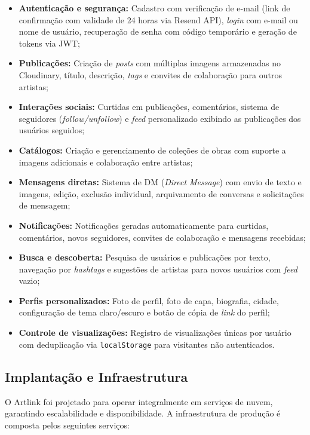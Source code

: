 \documentclass[a4paper, 12pt, oneside]{article}
\begin{document}
\begin{itemize}
    \item \textbf{Autenticação e segurança:} Cadastro com verificação de e-mail (link de confirmação com validade de 24 horas via Resend API), \textit{login} com e-mail ou nome de usuário, recuperação de senha com código temporário e geração de tokens via JWT;
    \item \textbf{Publicações:} Criação de \textit{posts} com múltiplas imagens armazenadas no Cloudinary, título, descrição, \textit{tags} e convites de colaboração para outros artistas;
    \item \textbf{Interações sociais:} Curtidas em publicações, comentários, sistema de seguidores (\textit{follow/unfollow}) e \textit{feed} personalizado exibindo as publicações dos usuários seguidos;
    \item \textbf{Catálogos:} Criação e gerenciamento de coleções de obras com suporte a imagens adicionais e colaboração entre artistas;
    \item \textbf{Mensagens diretas:} Sistema de DM (\textit{Direct Message}) com envio de texto e imagens, edição, exclusão individual, arquivamento de conversas e solicitações de mensagem;
    \item \textbf{Notificações:} Notificações geradas automaticamente para curtidas, comentários, novos seguidores, convites de colaboração e mensagens recebidas;
    \item \textbf{Busca e descoberta:} Pesquisa de usuários e publicações por texto, navegação por \textit{hashtags} e sugestões de artistas para novos usuários com \textit{feed} vazio;
    \item \textbf{Perfis personalizados:} Foto de perfil, foto de capa, biografia, cidade, configuração de tema claro/escuro e botão de cópia de \textit{link} do perfil;
    \item \textbf{Controle de visualizações:} Registro de visualizações únicas por usuário com deduplicação via \texttt{localStorage} para visitantes não autenticados.
\end{itemize}

\subsection{Implantação e Infraestrutura}

O Artlink foi projetado para operar integralmente em serviços de nuvem, garantindo escalabilidade e disponibilidade. A infraestrutura de produção é composta pelos seguintes serviços:
\end{document}
